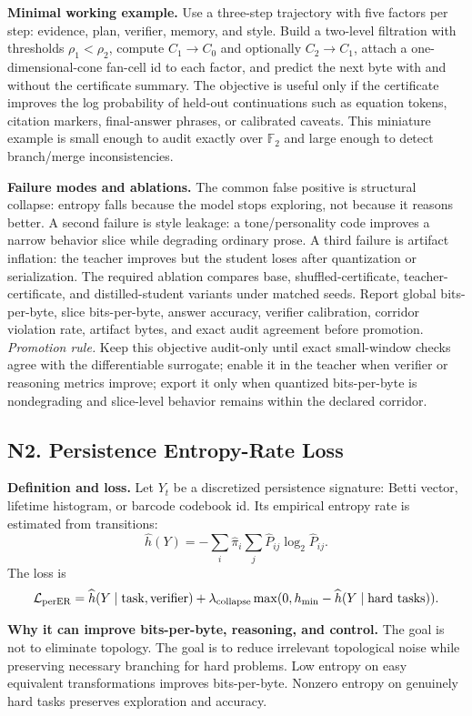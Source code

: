 \documentclass[10pt]{article}
\newcommand{\FF}{\mathbb{F}}
\newcommand{\loss}{\mathcal{L}}
\numberwithin{equation}{section}
\begin{document}
\noindent\textbf{Minimal working example.} Use a three-step trajectory with five factors per step: evidence, plan, verifier, memory, and style. Build a two-level filtration with thresholds $\rho_1<\rho_2$, compute $C_1\to C_0$ and optionally $C_2\to C_1$, attach a one-dimensional-cone fan-cell id to each factor, and predict the next byte with and without the certificate summary. The objective is useful only if the certificate improves the log probability of held-out continuations such as equation tokens, citation markers, final-answer phrases, or calibrated caveats. This miniature example is small enough to audit exactly over $\FF_2$ and large enough to detect branch/merge inconsistencies.

\noindent\textbf{Failure modes and ablations.} The common false positive is structural collapse: entropy falls because the model stops exploring, not because it reasons better. A second failure is style leakage: a tone/personality code improves a narrow behavior slice while degrading ordinary prose. A third failure is artifact inflation: the teacher improves but the student loses after quantization or serialization. The required ablation compares base, shuffled-certificate, teacher-certificate, and distilled-student variants under matched seeds. Report global bits-per-byte, slice bits-per-byte, answer accuracy, verifier calibration, corridor violation rate, artifact bytes, and exact audit agreement before promotion.
\vfill
\noindent\emph{Promotion rule.} Keep this objective audit-only until exact small-window checks agree with the differentiable surrogate; enable it in the teacher when verifier or reasoning metrics improve; export it only when quantized bits-per-byte is nondegrading and slice-level behavior remains within the declared corridor.
\clearpage
\subsection{N2. Persistence Entropy-Rate Loss}
\noindent\textbf{Definition and loss.} Let $Y_t$ be a discretized persistence signature: Betti vector, lifetime histogram, or barcode codebook id. Its empirical entropy rate is estimated from transitions:
\[
\widehat h(Y)=-\sum_i\widehat\pi_i\sum_j\widehat P_{ij}\log_2\widehat P_{ij}.
\]
The loss is
\[
\loss_{\rm perER}=\widehat h(Y\mid\mathrm{task},\mathrm{verifier})+\lambda_{\rm collapse}\max(0,h_{\min}-\widehat h(Y\mid\mathrm{hard\ tasks})).
\]

\noindent\textbf{Why it can improve bits-per-byte, reasoning, and control.} The goal is not to eliminate topology. The goal is to reduce irrelevant topological noise while preserving necessary branching for hard problems. Low entropy on easy equivalent transformations improves bits-per-byte. Nonzero entropy on genuinely hard tasks preserves exploration and accuracy.
\end{document}
